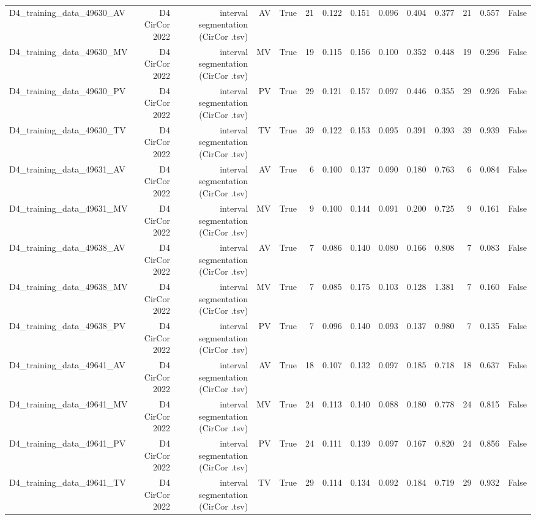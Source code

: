 \begin{table}[htbp]
\begin{tabular}{lrrrrrrrrrrrrr}
    D4\_training\_data\_49630\_AV & D4 CirCor 2022 & interval segmentation (CirCor .tsv) & AV & True & 21 & 0.122 & 0.151 & 0.096 & 0.404 & 0.377 & 21 & 0.557 & False \\
    D4\_training\_data\_49630\_MV & D4 CirCor 2022 & interval segmentation (CirCor .tsv) & MV & True & 19 & 0.115 & 0.156 & 0.100 & 0.352 & 0.448 & 19 & 0.296 & False \\
    D4\_training\_data\_49630\_PV & D4 CirCor 2022 & interval segmentation (CirCor .tsv) & PV & True & 29 & 0.121 & 0.157 & 0.097 & 0.446 & 0.355 & 29 & 0.926 & False \\
    D4\_training\_data\_49630\_TV & D4 CirCor 2022 & interval segmentation (CirCor .tsv) & TV & True & 39 & 0.122 & 0.153 & 0.095 & 0.391 & 0.393 & 39 & 0.939 & False \\
    D4\_training\_data\_49631\_AV & D4 CirCor 2022 & interval segmentation (CirCor .tsv) & AV & True & 6 & 0.100 & 0.137 & 0.090 & 0.180 & 0.763 & 6 & 0.084 & False \\
    D4\_training\_data\_49631\_MV & D4 CirCor 2022 & interval segmentation (CirCor .tsv) & MV & True & 9 & 0.100 & 0.144 & 0.091 & 0.200 & 0.725 & 9 & 0.161 & False \\
    D4\_training\_data\_49638\_AV & D4 CirCor 2022 & interval segmentation (CirCor .tsv) & AV & True & 7 & 0.086 & 0.140 & 0.080 & 0.166 & 0.808 & 7 & 0.083 & False \\
    D4\_training\_data\_49638\_MV & D4 CirCor 2022 & interval segmentation (CirCor .tsv) & MV & True & 7 & 0.085 & 0.175 & 0.103 & 0.128 & 1.381 & 7 & 0.160 & False \\
    D4\_training\_data\_49638\_PV & D4 CirCor 2022 & interval segmentation (CirCor .tsv) & PV & True & 7 & 0.096 & 0.140 & 0.093 & 0.137 & 0.980 & 7 & 0.135 & False \\
    D4\_training\_data\_49641\_AV & D4 CirCor 2022 & interval segmentation (CirCor .tsv) & AV & True & 18 & 0.107 & 0.132 & 0.097 & 0.185 & 0.718 & 18 & 0.637 & False \\
    D4\_training\_data\_49641\_MV & D4 CirCor 2022 & interval segmentation (CirCor .tsv) & MV & True & 24 & 0.113 & 0.140 & 0.088 & 0.180 & 0.778 & 24 & 0.815 & False \\
    D4\_training\_data\_49641\_PV & D4 CirCor 2022 & interval segmentation (CirCor .tsv) & PV & True & 24 & 0.111 & 0.139 & 0.097 & 0.167 & 0.820 & 24 & 0.856 & False \\
    D4\_training\_data\_49641\_TV & D4 CirCor 2022 & interval segmentation (CirCor .tsv) & TV & True & 29 & 0.114 & 0.134 & 0.092 & 0.184 & 0.719 & 29 & 0.932 & False \\

\end{tabular}
\end{table}
